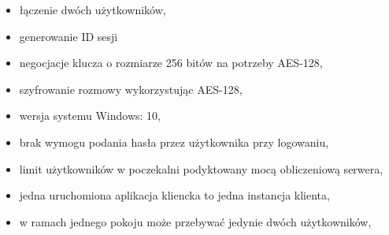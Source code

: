 \begin{itemize}
\item łączenie dwóch użytkowników,
\item generowanie ID sesji
\item negocjacje klucza o rozmiarze 256 bitów na potrzeby AES-128,
\item szyfrowanie rozmowy wykorzystując AES-128,
\item wersja systemu Windows: 10,
\item brak wymogu podania hasła przez użytkownika przy logowaniu,
\item limit użytkowników w poczekalni podyktowany mocą obliczeniową serwera,
\item jedna uruchomiona aplikacja kliencka to jedna instancja klienta,	\item w ramach jednego pokoju może przebywać jedynie dwóch użytkowników,
\end{itemize}
